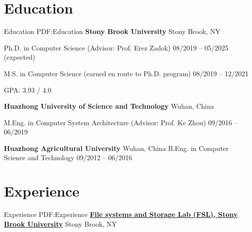 \documentclass[a4paper,10pt,oneside]{article}
\begin{document}
\begin{body}


\section
{Education}
{Education}
{PDF:Education}
{\textbf{Stony Brook University}}
\hfill
Stony Brook, NY

\BulletItem
Ph.D. in
{Computer Science} (Advisor: Prof. Erez Zadok)
\hfill
08/2019 -- 05/2025 (expected)

\BulletItem
M.S. in
{Computer Science} (earned en route to Ph.D. program)
\hfill
08/2019 -- 12/2021


\begin{detail}
\BulletItem
GPA: 3.93 / 4.0 

\end{detail}

\GapNoBreak

{\textbf{Huazhong University of Science and Technology}}
\hfill
Wuhan, China

\GapNoBreak
\BulletItem
M.Eng. in
{Computer System Architecture} (Advisor: Prof. Ke Zhou)
\hfill
09/2016 -- 06/2019
\begin{detail}
\end{detail}

\GapNoBreak

{\textbf{Huazhong Agricultural University}}
\hfill
Wuhan, China
\GapNoBreak
\BulletItem
B.Eng. in
{Computer Science and Technology}
\hfill
09/2012 -- 06/2016
\begin{detail}
\end{detail}


\section
{Experience}
{Experience}
{PDF:Experience}
\href{https://www.fsl.cs.stonybrook.edu/}
{{\textbf{File systems and Storage Lab (FSL), Stony Brook University}}}
\hfill
Stony Brook, NY


\end{body}
\end{document}
